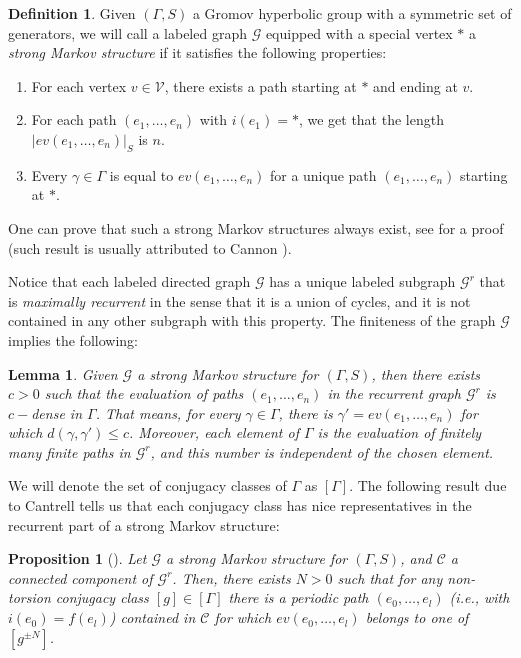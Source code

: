 \documentclass{amsart}
\newtheorem{lemma}[thm]{Lemma}
\newtheorem{prop}[thm]{Proposition}
\theoremstyle{remark}
\theoremstyle{definition}
\newtheorem{defi}[thm]{Definition}
\begin{document}
\begin{defi}
 Given $(\Gamma, S)$ a Gromov hyperbolic group with a symmetric set of generators, we will call a labeled graph $\mathcal{G}$ equipped with a special vertex $*$ a \emph{strong Markov structure} if it satisfies the following properties:
   \begin{enumerate}
      \item For each vertex $v \in \mathcal{V}$, there exists a path starting at $*$ and ending at $v$.
      \item For each path $(e_1,\ldots,e_n)$ with $i(e_1) = *$, we get that the length $|ev(e_1,\ldots,e_n)|_S$ is $n$.
      \item Every $\gamma \in \Gamma$ is equal to $ev (e_1,\ldots,e_n)$ for a unique path $(e_1,\ldots,e_n)$ starting at $*$.
   \end{enumerate}
\end{defi}

One can prove that such a strong Markov structures always exist, see \cite[Section 3.2]{calegari2011ergodic} for a proof (such result is usually attributed to Cannon \cite{cannon1984combinatorial}).

Notice that each labeled directed graph $\mathcal{G}$ has a unique labeled subgraph $\mathcal{G}^r$ that is \emph{maximally recurrent} in the sense that it is a union of cycles, and it is not contained in any other subgraph with this property.
The finiteness of the graph $\mathcal{G}$ implies the following:

\begin{lemma}
\label{lemma:densityandfiniteness}
 Given $\mathcal{G}$ a strong Markov structure for $(\Gamma,S)$, then there exists $c >0$ such that the evaluation of paths $(e_1,\ldots,e_n)$ in the recurrent graph $\mathcal{G}^r$ is $c-$dense in $\Gamma$.
 That means, for every $\gamma \in \Gamma$, there is $\gamma' = ev(e_1,\ldots,e_n)$ for which $d(\gamma,\gamma') \leq c$.
 Moreover, each element of $\Gamma$ is the evaluation of finitely many finite paths in $\mathcal{G}^r$, and this number is independent of the chosen element.
\end{lemma}

We will denote the set of conjugacy classes of $\Gamma$ as $[\Gamma]$.
The following result due to Cantrell tells us that each conjugacy class has nice representatives in the recurrent part of a strong Markov structure:

\begin{prop}[{\cite[Corollary 3.5]{cantrell2025mixing}}]
\label{prop:cantrell}
 Let $\mathcal{G}$ a strong Markov structure for $(\Gamma,S)$, and $\mathcal{C}$ a connected component of $\mathcal{G}^r$.
 Then, there exists $N>0$ such that for any non-torsion conjugacy class $[g] \in [\Gamma]$ there is a periodic path $(e_0,\ldots, e_l)$ (i.e., with $i(e_0) = f(e_l)$) contained in $\mathcal{C}$ for which $ev (e_0,\ldots,e_l)$ belongs to one of $[g^{\pm N}]$.   
\end{prop}
\end{document}
